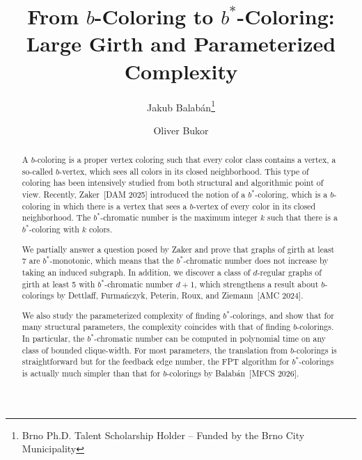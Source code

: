 \documentclass[runningheads, envcountsame]{llncs}
\newcommand{\FPT}{\textsf{FPT}\xspace}
\begin{document}
\title{From $b$-Coloring to $b^*$-Coloring: Large Girth and Parameterized Complexity}
%
%
\author{Jakub Balabán\thanks{Brno Ph.D. Talent Scholarship Holder – Funded by the Brno City Municipality}
 \and
Oliver Bukor}




\maketitle

\begin{abstract}

A $b$-coloring is a proper vertex coloring such that every color class contains a vertex, a so-called $b$-vertex, which sees all colors in its closed neighborhood.
This type of coloring has been intensively studied from both structural and algorithmic point of view.
Recently, Zaker~[DAM 2025] introduced the notion of a $b^*$-coloring, which is a $b$-coloring in which there is a vertex that sees a $b$-vertex of every color in its closed neighborhood.
The $b^*$-chromatic number is the maximum integer $k$ such that there is a $b^*$-coloring with $k$ colors.

We partially answer a question posed by Zaker and prove that graphs of girth at least 7 are $b^*$-monotonic, which means that the $b^*$-chromatic number does not increase by taking an induced subgraph.
In addition, we discover a class of $d$-regular graphs of girth at least 5 with $b^*$-chromatic number $d+1$, which strengthens a result about $b$-colorings by Dettlaff, Furmańczyk, Peterin, Roux, and Ziemann~[AMC 2024].

We also study the parameterized complexity of finding $b^*$-colorings, and show that for many structural parameters, the complexity coincides with that of finding $b$-colorings.
In particular, the $b^*$-chromatic number can be computed in polynomial time on any class of bounded clique-width.
For most parameters, the translation from $b$-colorings is straightforward but for the feedback edge number, the \FPT algorithm for $b^*$-colorings is actually much simpler than that for $b$-colorings by Balabán~[MFCS 2026].

\end{abstract}
\end{document}

